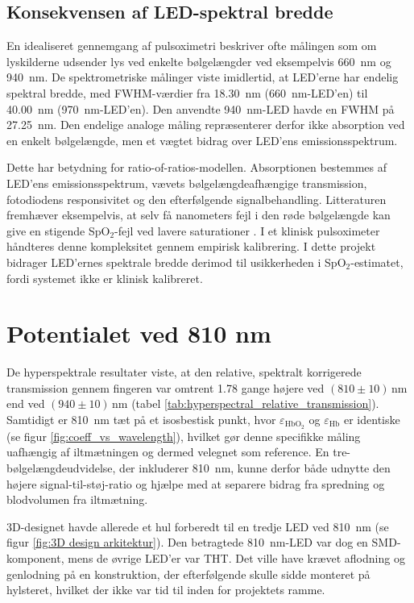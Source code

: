 \subsection{Konsekvensen af LED-spektral bredde}
En idealiseret gennemgang af pulsoximetri beskriver ofte målingen som om lyskilderne udsender lys ved enkelte bølgelængder ved eksempelvis \SI{660}{nm} og \SI{940}{nm}. De spektrometriske målinger viste imidlertid, at LED'erne har endelig spektral bredde, med FWHM-værdier fra \SI{18.30}{nm} (\SI{660}{nm}-LED'en) til \SI{40.00}{nm} (\SI{970}{nm}-LED'en). Den anvendte \SI{940}{nm}-LED havde en FWHM på \SI{27.25}{nm}. Den endelige analoge måling repræsenterer derfor ikke absorption ved en enkelt bølgelængde, men et vægtet bidrag over LED'ens emissionsspektrum.

Dette har betydning for ratio-of-ratios-modellen. Absorptionen bestemmes af LED'ens emissionsspektrum, vævets bølgelængdeafhængige transmission, fotodiodens responsivitet og den efterfølgende signalbehandling. Litteraturen fremhæver eksempelvis, at selv få nanometers fejl i den røde bølgelængde kan give en stigende SpO$_2$-fejl ved lavere saturationer \cite{Ruberry2025}. I et klinisk pulsoximeter håndteres denne kompleksitet gennem empirisk kalibrering. I dette projekt bidrager LED'ernes spektrale bredde derimod til usikkerheden i SpO$_2$-estimatet, fordi systemet ikke er klinisk kalibreret.

\section{Potentialet ved 810 nm}
De hyperspektrale resultater viste, at den relative, spektralt korrigerede transmission gennem fingeren var omtrent \num{1.78} gange højere ved $(810 \pm 10)\,\mathrm{nm}$ end ved $(940 \pm 10)\,\mathrm{nm}$ (tabel \ref{tab:hyperspectral_relative_transmission}). Samtidigt er \SI{810}{nm} tæt på et isosbestisk punkt, hvor $\varepsilon_{\text{HbO}_2}$ og $\varepsilon_{\text{Hb}}$ er identiske (se figur \ref{fig:coeff_vs_wavelength}), hvilket gør denne specifikke måling uafhængig af iltmætningen og dermed velegnet som reference. En tre-bølgelængdeudvidelse, der inkluderer \SI{810}{nm}, kunne derfor både udnytte den højere signal-til-støj-ratio og hjælpe med at separere bidrag fra spredning og blodvolumen fra iltmætning.

3D-designet havde allerede et hul forberedt til en tredje LED ved \SI{810}{nm} (se figur \ref{fig:3D design arkitektur}). Den betragtede \SI{810}{nm}-LED var dog en SMD-komponent, mens de øvrige LED'er var THT. Det ville have krævet aflodning og genlodning på en konstruktion, der efterfølgende skulle sidde monteret på hylsteret, hvilket der ikke var tid til inden for projektets ramme.

